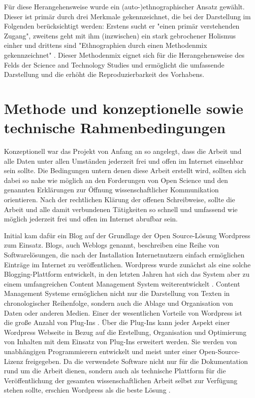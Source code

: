 Für diese Herangehensweise wurde ein (auto-)ethnographischer Ansatz gewählt. Dieser ist primär durch drei Merkmale gekennzeichnet, die bei der Darstellung im Folgenden berücksichtigt werden:  Erstens sucht er  "einen primär verstehenden Zugang", zweitens geht mit ihm (inzwischen) ein stark gebrochener Holismus einher und drittens sind "Ethnographien durch einen Methodenmix gekennzeichnet" \cite{bachmann_2011_ethnographie}. Dieser Methodenmix eignet sich für die Herangehensweise des Felds der Science and Technology Studies und ermöglicht die umfassende Darstellung und die erhöht die Reproduzierbarkeit des Vorhabens.

\section{Methode und konzeptionelle sowie technische Rahmenbedingungen}

Konzeptionell war das Projekt von Anfang an so angelegt, dass die Arbeit und alle Daten unter allen Umständen jederzeit frei und offen im Internet einsehbar sein sollte. Die Bedingungen untern denen diese Arbeit erstellt wird, sollten sich dabei so nahe wie möglich an den Forderungen von Open Science und den genannten Erklärungen zur Öffnung wissenschaftlicher Kommunikation orientieren. Nach der rechtlichen Klärung der offenen Schreibweise, sollte die Arbeit und alle damit verbundenen Tätigkeiten so schnell und umfassend wie möglich jederzeit frei und offen im Internet abrufbar sein.

Initial kam dafür ein Blog auf der Grundlage der Open Source-Lösung Wordpress zum Einsatz. Blogs, auch Weblogs genannt, beschreiben eine Reihe von Softwarelösungen, die nach der Installation Internetnutzern einfach ermöglichen Einträge im Internet zu veröffentlichen. Wordpress wurde zunächst als eine solche Blogging-Plattform entwickelt, in den letzten Jahren hat sich das System aber zu einem umfangreichen Content Management System weiterentwickelt \cite{Patel_2011_cms}. Content Management Systeme ermöglichen nicht nur die Darstellung von Texten in chronologischer Reihenfolge, sondern auch die Ablage und Organisation von Daten oder anderen Medien. Einer der wesentlichen Vorteile von Wordpress ist die große Anzahl von Plug-Ins \cite{Patel_2011_cms}. Über die Plug-Ins kann jeder Aspekt einer Wordpress Webseite in Bezug auf die Erstellung, Organisation und Optimierung von Inhalten mit dem Einsatz von Plug-Ins erweitert werden. Sie werden von unabhängigen Programmierern entwickelt und meist unter einer Open-Source-Lizenz freigegeben. Da die verwendete Software nicht nur für die Dokumentation rund um die Arbeit dienen, sondern auch als technische Plattform für die Veröffentlichung der gesamten wissenschaftlichen Arbeit selbst zur Verfügung stehen sollte, erschien Wordpress als die beste Lösung \cite{Jones_2013_CMS}.

